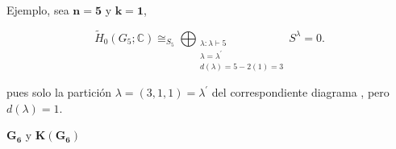 \documentclass[final,xcolor=svgnames]{beamer}
\begin{document}
\begin{frame}{}
\begin{columns}
\begin{column}{0.5\textwidth}
       \begin{block}{Ejemplo, sea $\boldsymbol{n=5}$ y $\boldsymbol{k=1}$,}
          \begin{minipage}{0.48\linewidth}    
            \centering
           \begin{equation*}
             \widetilde H_{0}(G_{5};\mathbb{C})\cong_{S_{5}}\bigoplus_{\substack{\lambda:\lambda\vdash 5\\
                 \lambda=\lambda^{'}\\d(\lambda)=5-2(1)=3}} S^{\lambda}=0.
           \end{equation*}
          \end{minipage}
          \begin{minipage}{0.5\linewidth}    
           pues solo la partición $\lambda=(3,1,1)=\lambda^{'}$ del
           correspondiente diagrama , pero
           $d(\lambda)=1$.
         \end{minipage}
       \end{block}
      
\begin{block}{$\boldsymbol{G_6}$ y $\boldsymbol{K(G_6)}$}
  \begin{minipage}{0.53\linewidth}    
    \centering


\end{minipage}
\end{block}
\end{column}
\end{columns}
\end{frame}
\end{document}
